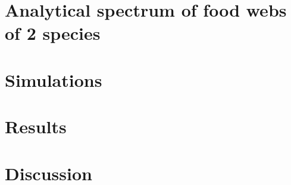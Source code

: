 \documentclass[a4paper,fleqn]{cas-dc}
\begin{document}
\section{Analytical spectrum of food webs of 2 species}


\section{Simulations}


\section{Results}


\section{Discussion}


\appendix


\printcredits

%
%



\end{document}
